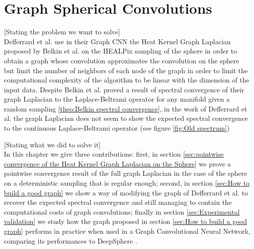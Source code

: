 

\section{Graph Spherical Convolutions}
[Stating the problem we want to solve]\\
Defferrard et al. \cite{DeepSphere} use in their Graph CNN the Heat Kernel Graph Laplacian proposed by Belkin et al. \cite{Belkin:2005:TTF:2138147.2138189} on the HEALPix sampling of the sphere in order to obtain a graph whose convolution approximates the convolution on the sphere but limit the number of neighbors of each node of the graph in order to limit the computational complexity of the algorithm to be linear with the dimension of the input data. Despite Belkin et al. proved a result of spectral convergence of their graph Laplacian to the Laplace-Beltrami operator for any manifold given a random sampling \ref{theo:Belkin spectral convergence}, in the work of Defferrard et al. the graph Laplacian does not seem to show the expected spectral convergence to the continuous Laplace-Beltrami operator (see figure \ref{fig:Old spectrum}) 

[Stating what we did to solve it]\\
In this chapter we give three contributions: first, in section \ref{sec:pointwise convergence of the Heat Kernel Graph Laplacian on the Sphere} we prove a pointwise convergence result of the full graph Laplacian in the case of the sphere on a deterministic sampling that is regular enough; second, in section \ref{sec:How to build a good graph} we show a way of modifying the graph of Defferrard et al. to recover the expected spectral convergence and still managing to contain the computational costs of graph convolutions; finally in section \ref{sec:Experimental validation} we study how the graph proposed in section \ref{sec:How to build a good graph} performs in practice when used in a Graph Convolutional Neural Network, comparing its performances to DeepSphere \cite{DeepSphere}.

